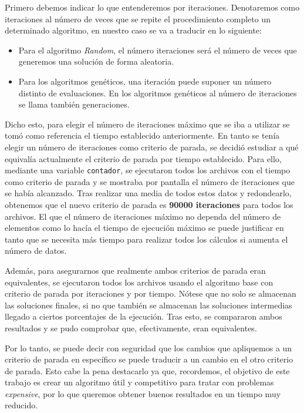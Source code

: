 Primero debemos indicar lo que entenderemos por iteraciones. 
Denotaremos como iteraciones al número de veces que se repite el procedimiento completo un determinado algoritmo, en nuestro caso se va a traducir en lo siguiente: 
\begin{itemize}
	\item Para el algoritmo \textit{Random}, el número iteraciones será el número de veces que generemos una solución de forma aleatoria.
	\item Para los algoritmos genéticos, una iteración puede suponer un número distinto de evaluaciones. 
	En los algoritmos genéticos al número de iteraciones se llama también generaciones.
\end{itemize}

Dicho esto, para elegir el número de iteraciones máximo que se iba a utilizar se tomó como referencia el tiempo establecido anteriormente. 
En tanto se tenía elegir un número de iteraciones como criterio de parada, se decidió estudiar a qué equivalía actualmente el criterio de parada por tiempo establecido. 
Para ello, mediante una variable \texttt{contador}, se ejecutaron todos los archivos con el tiempo como criterio de parada y se mostraba por pantalla el número de iteraciones que se había alcanzado. 
Tras realizar una media de todos estos datos y redondearlo, obtenemos que el nuevo criterio de parada es \textbf{90000 iteraciones} para todos los archivos. 
El que el número de iteraciones máximo no dependa del número de elementos como lo hacía el tiempo de ejecución máximo se puede justificar en tanto que se necesita más tiempo para realizar todos los cálculos si aumenta el número de datos. 

Además, para asegurarnos que realmente ambos criterios de parada eran equivalentes, se ejecutaron todos los archivos usando el algoritmo base con criterio de parada por iteraciones y por tiempo. 
Nótese que no solo se almacenan las soluciones finales, si no que también se almacenan las soluciones intermedias llegado a ciertos porcentajes de la ejecución. 
Tras esto, se compararon ambos resultados y se pudo comprobar que, efectivamente, eran equivalentes. 

Por lo tanto, se puede decir con seguridad que los cambios que apliquemos a un criterio de parada en específico se puede traducir a un cambio en el otro criterio de parada. 
Esto cabe la pena destacarlo ya que, recordemos, el objetivo de este trabajo es crear un algoritmo útil y competitivo para tratar con problemas \textit{expensive}, por lo que queremos obtener buenos resultados en un tiempo muy reducido. 


